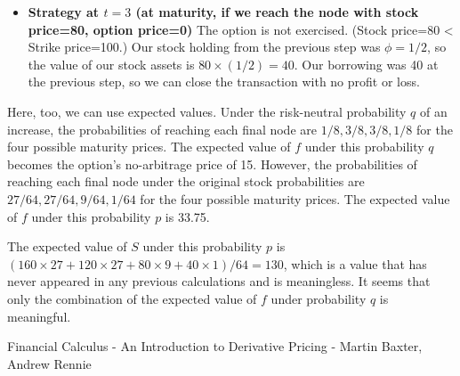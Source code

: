\documentclass[uplatex,a4j,12pt,dvipdfmx]{jsarticle}
\begin{document}
\begin{itemize}
	\item \textbf{Strategy at $t=3$ (at maturity, if we reach the node with stock price=80, option price=0)}
	      The option is not exercised. (Stock price=80 < Strike price=100.) Our stock holding from the previous step was $\phi=1/2$, so the value of our stock assets is $80 \times (1/2) = 40$. Our borrowing was 40 at the previous step, so we can close the transaction with no profit or loss.
\end{itemize}

Here, too, we can use expected values. Under the risk-neutral probability $q$ of an increase, the probabilities of reaching each final node are $1/8, 3/8, 3/8, 1/8$ for the four possible maturity prices. The expected value of $f$ under this probability $q$ becomes the option's no-arbitrage price of 15. However, the probabilities of reaching each final node under the original stock probabilities are $27/64, 27/64, 9/64, 1/64$ for the four possible maturity prices. The expected value of $f$ under this probability $p$ is 33.75. 

The expected value of $S$ under this probability $p$ is $(160 \times 27+120 \times 27+80 \times 9+40 \times 1)/64=130$, which is a value that has never appeared in any previous calculations and is meaningless.
It seems that only the combination of the expected value of $f$ under probability $q$ is meaningful.

\begin{thebibliography}{9}
	Financial Calculus - An Introduction to Derivative Pricing - Martin Baxter, Andrew Rennie
\end{thebibliography}
\end{document}
